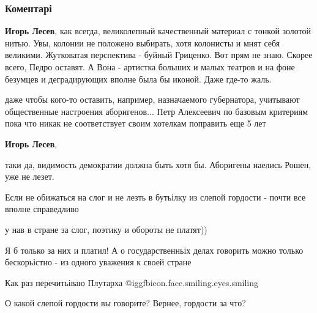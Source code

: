  
 
 
 
 
\subsubsection{Коментарі}

\begin{itemize} %
\textbf{Игорь Лесев}, как всегда, великолепный качественный материал с тонкой золотой нитью.
Увы, колонии не положено выбирать, хотя колонисты и мнят себя великими.
Жутковатая перспектива - буйный Гриценко. Вот прям не знаю. Скорее всего, Педро оставят.
А Вона - артистка больших и малых театров и на фоне безумцев и деградирующих вполне была бы иконой. Даже где-то жаль.

\begin{itemize} %

даже чтобы кого-то оставить, например, назначаемого губернатора, учитывают
общественные настроения аборигенов... Петр Алексеевич по базовым критериям пока
что никак не соответствует своим хотелкам поправить еще 5 лет

\textbf{Игорь Лесев}, 

таки да, видимость демократии должна быть хотя бы. Аборигены наелись Рошен, уже
не лезет.

\end{itemize} %


Если не обижаться на слог и не лезть в бутьілку из слепой гордости - почти все
вполне справедливо

\begin{itemize} %
у нав в стране за слог, поэтику и обороты не платят))

Я б только за них и платил! А о государственньіх делах говорить можно только бескорьістно - из одного уважения к своей стране

Как раз перечитьіваю Плутарха @igg{fbicon.face.smiling.eyes.smiling} 

О какой слепой гордости вы говорите? Вернее, гордости за что?


\end{itemize}
\end{itemize}
